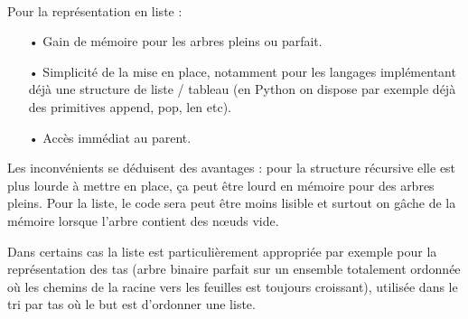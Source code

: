 \documentclass{article}
\begin{document}
\paragraph*{}
Pour la représentation en liste :
\begin{itemize}
\item[•]
Gain de mémoire pour les arbres pleins ou parfait.
\item[•]
Simplicité de la mise en place, notamment pour les langages implémentant déjà une structure de liste / tableau (en Python on dispose par exemple déjà des primitives append, pop, len etc).
\item[•]
Accès immédiat au parent.
\end{itemize}
Les inconvénients se déduisent des avantages : pour la structure récursive elle est plus lourde à mettre en place, ça peut être lourd en mémoire pour des arbres pleins.
Pour la liste, le code sera peut être moins lisible et surtout on gâche de la mémoire lorsque l'arbre contient des nœuds vide. 

Dans certains cas la liste est particulièrement appropriée par exemple pour la représentation des tas (arbre binaire parfait sur un ensemble totalement ordonnée où les chemins de la racine vers les feuilles est toujours croissant), utilisée dans le tri par tas où le but est d'ordonner une liste. 
\end{document}

